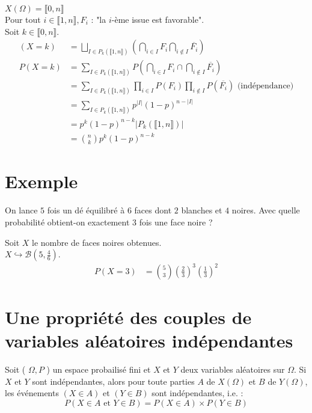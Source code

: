 \documentclass[../main.tex]{subfiles}
\begin{document}
\noindent $X(\Omega) = \llbracket 0, n \rrbracket$ \\
Pour tout $i\in \llbracket 1, n \rrbracket, F_i$ : "la $i$-ème issue est favorable". \\
Soit $k\in \llbracket 0, n \rrbracket$. \\
\begin{align*}
    (X = k) &= \bigsqcup_{I\in P_k (\llbracket 1, n \rrbracket)} \left( \bigcap_{i\in I} F_i \bigcap_{i\not\in I} \overline{F_i} \right) \\
    P(X = k) &= \sum_{I\in P_k(\llbracket 1, n \rrbracket)} P\left(\bigcap_{i\in I} F_i  \cap \bigcap_{i\not\in I} \overline{F_i}\right) \\
    &= \sum_{I\in P_k(\llbracket 1, n \rrbracket)} \prod_{i\in I}{P(F_i)} \prod_{i\not\in I}{P(\overline{F_i})} \text{ (indépendance)} \\
    &= \sum_{I\in P_k(\llbracket 1, n \rrbracket)} p^{|I|} (1-p)^{n - |I|} \\
    &= p^k (1-p)^{n-k} |P_k(\llbracket 1, n \rrbracket)| \\
    &= \binom{n}{k} p^k (1-p)^{n-k}
\end{align*}

\section{Exemple}
\begin{tcolorbox}[title=Exemple 32.48, title filled=false, colframe=darkgreen, colback=darkgreen!10!white]
    On lance $5$ fois un dé équilibré à $6$ faces dont $2$ blanches et $4$ noires. Avec quelle probabilité obtient-on exactement $3$ fois une face noire ?
\end{tcolorbox}

\noindent Soit $X$ le nombre de faces noires obtenues. \\
$X\hookrightarrow \mathcal{B}(5, \frac{4}{6})$. 
\begin{align*}
    P(X = 3) &= \binom{5}{3} \left(\frac{2}{3}\right)^3 \left(\frac{1}{3}\right)^2
\end{align*}

\section{Une propriété des couples de variables aléatoires indépendantes}
\begin{tcolorbox}[title=Théorème 32.50, title filled=false, colframe=orange, colback=orange!10!white]
    Soit ( $\Omega, P$ ) un espace probailisé fini et $X$ et $Y$ deux variables aléatoires sur $\Omega$. Si $X$ et $Y$ sont indépendantes, alors pour toute parties $A$ de $X(\Omega)$ et $B$ de $Y(\Omega)$, les événements $(X \in A)$ et $(Y \in B)$ sont indépendantes, i.e. :
    $$P(X \in A \text { et } Y \in B)=P(X \in A) \times P(Y \in B)$$
\end{tcolorbox}
\end{document}
